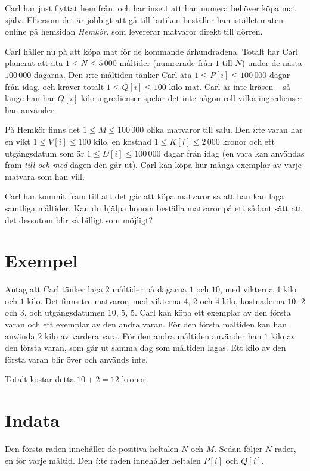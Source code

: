 Carl har just flyttat hemifrån, och har insett att han numera behöver köpa mat själv.
Eftersom det är jobbigt att gå till butiken beställer han istället maten online på hemsidan \emph{Hemkör}, som levererar matvaror direkt till dörren.

Carl håller nu på att köpa mat för de kommande århundradena.
Totalt har Carl planerat att äta $1 \le N \le 5\,000$ måltider (numrerade från $1$ till $N$) under de nästa $100\,000$ dagarna.
Den $i$:te måltiden tänker Carl äta $1 \le P[i] \le 100\,000$ dagar från idag, och kräver totalt $1 \le Q[i] \le 100$ kilo mat.
Carl är inte kräsen -- så länge han har $Q[i]$ kilo ingredienser spelar det inte någon roll vilka ingredienser han använder.

På Hemkör finns det $1 \le M \le 100\,000$ olika matvaror till salu.
Den $i$:te varan har en vikt $1 \le V[i] \le 100$ kilo, en kostnad $1 \le K[i] \le 2\,000$ kronor och ett utgångsdatum som är $1 \le D[i] \le 100\,000$ dagar från idag (en vara kan användas fram \emph{till och med} dagen den går ut).
Carl kan köpa hur många exemplar av varje matvara som han vill.

Carl har kommit fram till att det går att köpa matvaror så att han kan laga samtliga måltider.
Kan du hjälpa honom beställa matvaror på ett sådant sätt att det dessutom blir så billigt som möjligt?


\section*{Exempel}
Antag att Carl tänker laga $2$ måltider på dagarna $1$ och $10$, med vikterna $4$ kilo och $1$ kilo.
Det finns tre matvaror, med vikterna $4$, $2$ och $4$ kilo, kostnaderna $10$, $2$ och $3$, och utgångsdatumen $10$, $5$, $5$.
Carl kan köpa ett exemplar av den första varan och ett exemplar av den andra varan.
För den första måltiden kan han använda $2$ kilo av vardera vara.
För den andra måltiden använder han $1$ kilo av den första varan, som går ut samma dag som måltiden lagas.
Ett kilo av den första varan blir över och används inte.

Totalt kostar detta $10 + 2 = 12$ kronor.

\section*{Indata}
Den första raden innehåller de positiva heltalen $N$ och $M$.
Sedan följer $N$ rader, en för varje måltid.
Den $i$:te raden innehåller heltalen $P[i]$ och $Q[i]$.

